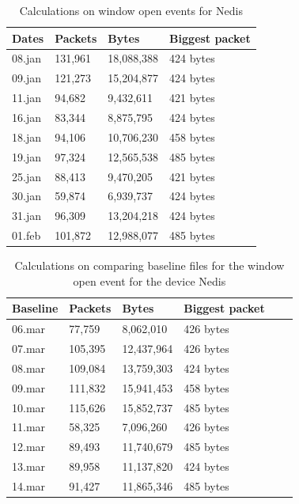 \begin{table}[H]
\centering
    \caption{Calculations on window open events for Nedis}
\label{tab:NedisWindowCalculations}
    \begin{tabular}{|l|l|l|l|}
        \hline
        \textbf{Dates} & \textbf{Packets} & \textbf{Bytes} & \textbf{Biggest packet} \\ \hline
        08.jan          & 131,961          & 18,088,388     & 424 bytes               \\ \hline
        09.jan          & 121,273          & 15,204,877     & 424 bytes               \\ \hline
        11.jan          & 94,682           & 9,432,611      & 421 bytes               \\ \hline
        16.jan          & 83,344           & 8,875,795      & 424 bytes               \\ \hline
        18.jan          & 94,106           & 10,706,230     & 458 bytes               \\ \hline
        19.jan          & 97,324           & 12,565,538     & 485 bytes               \\ \hline
        25.jan          & 88,413           & 9,470,205      & 421 bytes               \\ \hline
        30.jan          & 59,874           & 6,939,737      & 424 bytes               \\ \hline
        31.jan          & 96,309           & 13,204,218     & 424 bytes               \\ \hline
        01.feb          & 101,872          & 12,988,077     & 485 bytes               \\ \hline
    \end{tabular}
\end{table}

\begin{table}[H]
    \centering
    \caption{Calculations on comparing baseline files for the window open event for the device Nedis}
    \begin{tabular}{|l|l|l|l|l|l|}
    \hline
        \textbf{Baseline} & \textbf{Packets} & \textbf{Bytes} & \textbf{Biggest packet} \\ \hline
        06.mar & 77,759  & 8,062,010  & 426 bytes \\ \hline
        07.mar & 105,395 & 12,437,964 & 426 bytes \\ \hline
        08.mar & 109,084 & 13,759,303 & 424 bytes \\ \hline
        09.mar & 111,832 & 15,941,453 & 458 bytes \\ \hline
        10.mar & 115,626 & 15,852,737 & 485 bytes \\ \hline
        11.mar & 58,325  & 7,096,260  & 426 bytes \\ \hline
        12.mar & 89,493  & 11,740,679 & 485 bytes \\ \hline
        13.mar & 89,958  & 11,137,820 & 424 bytes \\ \hline
        14.mar & 91,427  & 11,865,346 & 485 bytes \\ \hline
    \end{tabular}
    \label{tab:NedisBaselineWindowCalculations}
\end{table}

